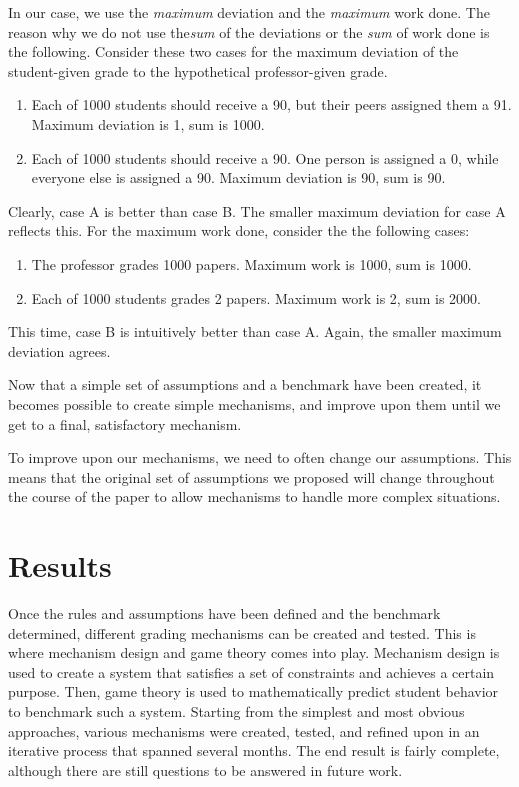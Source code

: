 \documentclass[12pt, Arial]{article}
\begin{document}
In our case, we use the \emph{maximum} deviation and the \emph{maximum} work done. The reason why we do not use the\emph{sum} of the deviations or the \emph{sum} of work done is the following. Consider these two cases for the maximum deviation of the student-given grade to the hypothetical professor-given grade.
\begin{enumerate}[label=\Alph*]
\item Each of 1000 students should receive a 90, but their peers assigned them a 91. Maximum deviation is 1, sum is 1000.
\item Each of 1000 students should receive a 90. One person is assigned a 0, while everyone else is assigned a 90. Maximum deviation is 90, sum is 90.
\end{enumerate}
Clearly, case A is better than case B. The smaller maximum deviation for case A reflects this.
For the maximum work done, consider the the following cases:
\begin{enumerate}[label=\Alph*]
\item The professor grades 1000 papers. Maximum work is 1000, sum is 1000.
\item Each of 1000 students grades 2 papers. Maximum work is 2, sum is 2000.
\end{enumerate}
This time, case B is intuitively better than case A. Again, the smaller maximum deviation agrees.


Now that a simple set of assumptions and a benchmark have been created, it becomes possible to create simple mechanisms, and improve upon them until we get to a final, satisfactory mechanism.

To improve upon our mechanisms, we need to often change our assumptions. This means that the original set of assumptions we proposed will change throughout the course of the paper to allow mechanisms to handle more complex situations.

\section{Results}
Once the rules and assumptions have been defined and the benchmark determined, different grading mechanisms can be created and tested. This is where mechanism design and game theory comes into play. Mechanism design is used to create a system that satisfies a set of constraints and achieves a certain purpose. Then, game theory is used to mathematically predict student behavior to benchmark such a system. Starting from the simplest and most obvious approaches, various mechanisms were created, tested, and refined upon in an iterative process that spanned several months. The end result is fairly complete, although there are still questions to be answered in future work.
\end{document}
